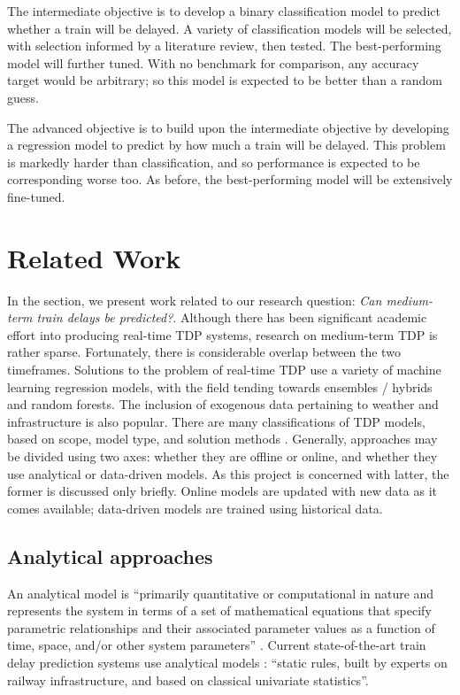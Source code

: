 \documentclass[12pt,a4paper]{article}
\begin{document}
The intermediate objective is to develop a binary classification model to predict whether a train will be delayed. A variety of classification models will be selected, with selection informed by a literature review, then tested. The best-performing model will further tuned. With no benchmark for comparison, any accuracy target would be arbitrary; so this model is expected to be better than a random guess. 

The advanced objective is to build upon the intermediate objective by developing a regression model to predict by how much a train will be delayed. This problem is markedly harder than classification, and so performance is expected to be corresponding worse too. As before, the best-performing model will be extensively fine-tuned.

\section{Related Work}
\label{section:related_work}

In the section, we present work related to our research question: \textit{Can medium-term train delays be predicted?}. Although there has been significant academic effort into producing real-time TDP systems, research on medium-term TDP is rather sparse. Fortunately, there is considerable overlap between the two timeframes. Solutions to the problem of real-time TDP use a variety of machine learning regression models, with the field tending towards ensembles / hybrids  and random forests. The inclusion of exogenous data pertaining to weather and infrastructure is also popular.  There are many classifications of TDP models, based on scope, model type, and solution methods \cite{markovic_et_al_2015}. Generally, approaches may be divided using two axes: whether they are offline or online, and whether they use analytical or data-driven models. As this project is concerned with latter, the former is discussed only briefly. Online models are updated with new data as it comes available; data-driven models are trained using historical data.

\subsection{Analytical approaches}

An analytical model is “primarily quantitative or computational in nature and represents the system in terms of a set of mathematical equations that specify parametric relationships and their associated parameter values as a function of time, space, and/or other system parameters” \cite{friedenthal_moore_steiner_2012}. Current state-of-the-art train delay prediction systems use analytical models \cite{oneto_et_al_2016}: “static rules, built by experts on railway infrastructure, and based on classical univariate statistics”.
\end{document}
